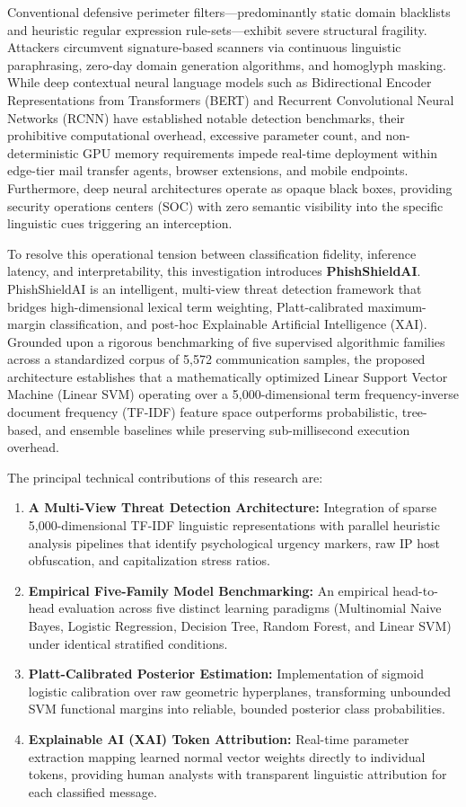 \documentclass[conference]{IEEEtran}
\begin{document}
Conventional defensive perimeter filters—predominantly static domain blacklists and heuristic regular expression rule-sets—exhibit severe structural fragility. Attackers circumvent signature-based scanners via continuous linguistic paraphrasing, zero-day domain generation algorithms, and homoglyph masking. While deep contextual neural language models such as Bidirectional Encoder Representations from Transformers (BERT) and Recurrent Convolutional Neural Networks (RCNN) have established notable detection benchmarks, their prohibitive computational overhead, excessive parameter count, and non-deterministic GPU memory requirements impede real-time deployment within edge-tier mail transfer agents, browser extensions, and mobile endpoints. Furthermore, deep neural architectures operate as opaque black boxes, providing security operations centers (SOC) with zero semantic visibility into the specific linguistic cues triggering an interception.

To resolve this operational tension between classification fidelity, inference latency, and interpretability, this investigation introduces \textbf{PhishShieldAI}. PhishShieldAI is an intelligent, multi-view threat detection framework that bridges high-dimensional lexical term weighting, Platt-calibrated maximum-margin classification, and post-hoc Explainable Artificial Intelligence (XAI). Grounded upon a rigorous benchmarking of five supervised algorithmic families across a standardized corpus of 5,572 communication samples, the proposed architecture establishes that a mathematically optimized Linear Support Vector Machine (Linear SVM) operating over a 5,000-dimensional term frequency-inverse document frequency (TF-IDF) feature space outperforms probabilistic, tree-based, and ensemble baselines while preserving sub-millisecond execution overhead.

The principal technical contributions of this research are:
\begin{enumerate}
    \item \textbf{A Multi-View Threat Detection Architecture:} Integration of sparse 5,000-dimensional TF-IDF linguistic representations with parallel heuristic analysis pipelines that identify psychological urgency markers, raw IP host obfuscation, and capitalization stress ratios.
    \item \textbf{Empirical Five-Family Model Benchmarking:} An empirical head-to-head evaluation across five distinct learning paradigms (Multinomial Naive Bayes, Logistic Regression, Decision Tree, Random Forest, and Linear SVM) under identical stratified conditions.
    \item \textbf{Platt-Calibrated Posterior Estimation:} Implementation of sigmoid logistic calibration over raw geometric hyperplanes, transforming unbounded SVM functional margins into reliable, bounded posterior class probabilities.
    \item \textbf{Explainable AI (XAI) Token Attribution:} Real-time parameter extraction mapping learned normal vector weights directly to individual tokens, providing human analysts with transparent linguistic attribution for each classified message.
\end{enumerate}
\end{document}

